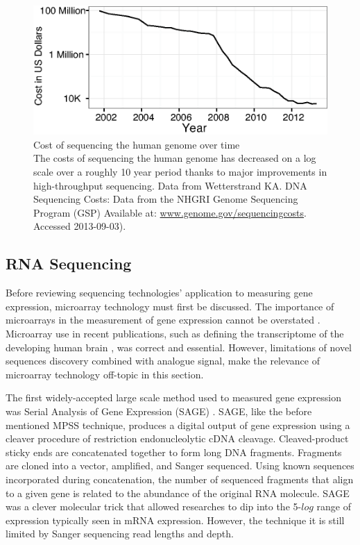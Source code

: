     \begin{figure} %
      \centering 
      \includegraphics{Figures/Intro/Sequencing_costs_over_time.eps}
      \caption[Cost of sequencing the human genome over time]
      {
        Cost of sequencing the human genome over time\\[0.25cm]
        The costs of sequencing the human genome has decreased on a log scale over a roughly 10 year period thanks to major improvements in high-throughput sequencing. Data from Wetterstrand KA. DNA Sequencing Costs: Data from the NHGRI Genome Sequencing Program (GSP) Available at: \url{www.genome.gov/sequencingcosts}. Accessed 2013-09-03).
        }
      \label{Intro:fig:SeqCosts}
      \end{figure}

  \subsection{RNA Sequencing}
    \label{Intro:subsec:Types of HTS}

    Before reviewing sequencing technologies' application to measuring gene expression, microarray technology must first be discussed. The importance of microarrays in the measurement of gene expression cannot be overstated \citep{Shendure2008,Marioni2008}. Microarray use in recent publications, such as defining the transcriptome of the developing human brain \cite{Miller2014}, was correct and essential. However, limitations of novel sequences discovery combined with analogue signal, make the relevance of microarray technology off-topic in this section.

    The first widely-accepted large scale method used to measured gene expression was Serial Analysis of Gene Expression (SAGE) \citep{Velculescu1995a}. SAGE, like the before mentioned MPSS technique, produces a digital output of gene expression using a cleaver procedure of restriction endonucleolytic cDNA cleavage. Cleaved-product sticky ends are concatenated together to form long DNA fragments. Fragments are cloned into a vector, amplified, and Sanger sequenced. Using known sequences incorporated during concatenation, the number of sequenced fragments that align to a given gene is related to the abundance of the original RNA molecule. SAGE was a clever molecular trick that allowed researches to dip into the 5-$log$ range of expression typically seen in mRNA expression. However, the technique it is still limited by Sanger sequencing read lengths and depth.

